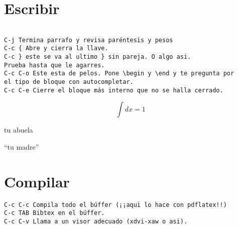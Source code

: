 



\section{Escribir}
  
\begin{verbatim}

C-j Termina parrafo y revisa paréntesis y pesos
C-c { Abre y cierra la llave.
C-c } este se va al ultimo } sin pareja. O algo asi. 
Prueba hasta que le agarres.
C-c C-o Este esta de pelos. Pone \begin y \end y te pregunta por
el tipo de bloque con autocompletar.
C-c C-e Cierre el bloque más interno que no se halla cerrado.

\end{verbatim}

\begin{equation}
  \int d x = 1
\end{equation}

  
{tu abuela}

``tu madre'' 

\section{Compilar}

\begin{verbatim}
C-c C-c Compila todo el búffer (¡¡aqui lo hace con pdflatex!!)
C-c TAB Bibtex en el búffer.
C-c C-v Llama a un visor adecuado (xdvi-xaw o asi).  

\end{verbatim}


